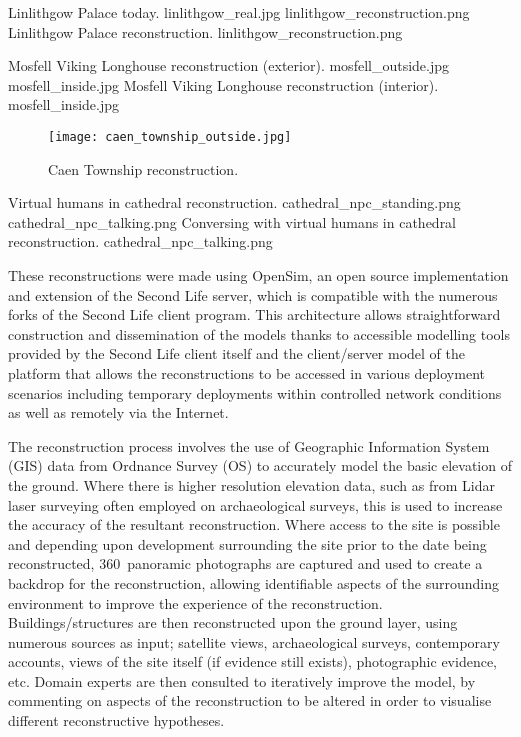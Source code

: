  {Linlithgow Palace today.} {linlithgow_real.jpg}
       {linlithgow_reconstruction.png} {Linlithgow Palace reconstruction.} {linlithgow_reconstruction.png}

 {Mosfell Viking Longhouse reconstruction (exterior).} {mosfell_outside.jpg}
	   {mosfell_inside.jpg} {Mosfell Viking Longhouse reconstruction (interior).} {mosfell_inside.jpg}


\begin{figure}[h]
\centering
  \texttt{[image: caen\_township\_outside.jpg]}
  \caption{Caen Township reconstruction.}
  \label{caen_township_outside.jpg}
\end{figure}

 {Virtual humans in cathedral reconstruction.} {cathedral_npc_standing.png}
       {cathedral_npc_talking.png} {Conversing with virtual humans in cathedral reconstruction.} {cathedral_npc_talking.png}

These reconstructions were made using OpenSim, an open source implementation and extension of the Second Life server, which is compatible with the numerous forks of the Second Life client program. This architecture allows straightforward construction and dissemination of the models thanks to accessible modelling tools provided by the Second Life client itself and the client/server model of the platform that allows the reconstructions to be accessed in various deployment scenarios including temporary deployments within controlled network conditions as well as remotely via the Internet.

The reconstruction process involves the use of Geographic Information System (GIS) data from Ordnance Survey (OS) to accurately model the basic elevation of the ground. Where there is higher resolution elevation data, such as from Lidar laser surveying often employed on archaeological surveys, this is used to increase the accuracy of the resultant reconstruction. Where access to the site is possible and depending upon development surrounding the site prior to the date being reconstructed, 360\textdegree\ panoramic photographs are captured and used to create a backdrop for the reconstruction, allowing identifiable aspects of the surrounding environment to improve the experience of the reconstruction. Buildings/structures are then reconstructed upon the ground layer, using numerous sources as input; satellite views, archaeological surveys, contemporary accounts, views of the site itself (if evidence still exists), photographic evidence, etc. Domain experts are then consulted to iteratively improve the model, by commenting on aspects of the reconstruction to be altered in order to visualise different reconstructive hypotheses.

